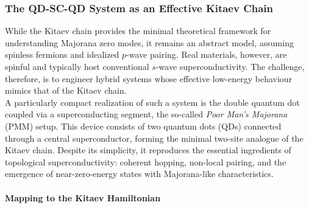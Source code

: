 \subsubsection{The QD-SC-QD System as an Effective Kitaev Chain}
While the Kitaev chain provides the minimal theoretical framework for understanding Majorana zero modes, it remains an abstract model, assuming spinless fermions and idealized $p$-wave pairing. Real materials, however, are spinful and typically host conventional $s$-wave superconductivity. The challenge, therefore, is to engineer hybrid systems whose effective low-energy behaviour mimics that of the Kitaev chain.\\
A particularly compact realization of such a system is the double quantum dot coupled via a superconducting segment, the so-called \textit{Poor Man’s Majorana} (PMM) setup. This device consists of two quantum dots (QDs) connected through a central superconductor, forming the minimal two-site analogue of the Kitaev chain. Despite its simplicity, it reproduces the essential ingredients of topological superconductivity: coherent hopping, non-local pairing, and the emergence of near-zero-energy states with Majorana-like characteristics.

\paragraph{Mapping to the Kitaev Hamiltonian}

